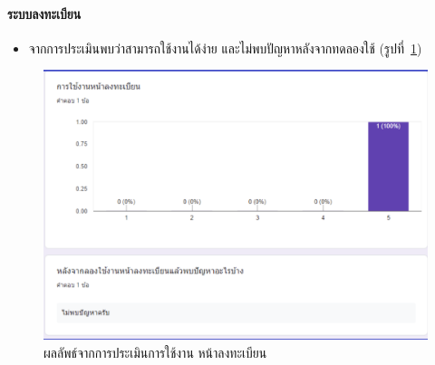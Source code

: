 \paragraph{ระบบลงทะเบียน}
\begin{itemize}
  \item จากการประเมินพบว่าสามารถใช้งานได้ง่าย และไม่พบปัญหาหลังจากทดลองใช้ (รูปที่~\ref{fig:Eval1})
\end{itemize}
\begin{figure}
  \begin{center}
    \includegraphics[width=\linewidth]{images/eval1.png}
  \end{center}
  \caption[ผลลัพธ์จากการประเมินการใช้งาน หน้าลงทะเบียน]{ผลลัพธ์จากการประเมินการใช้งาน หน้าลงทะเบียน}
  \label{fig:Eval1}
\end{figure}

